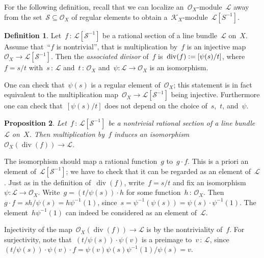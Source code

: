 \documentclass[10pt,reqno,a4paper]{amsbook}
\makeatletter
\theoremstyle{definition}
\newtheorem{defn}{Definition}[section]
\theoremstyle{plain}
\newtheorem{prop}[defn]{Proposition}
\theoremstyle{remark}
\newtheorem{rem}[defn]{Remark}
\renewcommand{\O}{\mathcal{O}}
\newcommand{\K}{\mathcal{K}}
\renewcommand{\L}{\mathcal{L}}
\renewcommand{\S}{\mathcal{S}}
\newcommand{\?}{\,{:}\,}
\renewcommand{\_}{\mathpunct{.}\,}
\newcommand{\XXX}[1]{\textbf{XXX: #1}}
\newcommand{\defeq}{\vcentcolon=}
\renewenvironment{proof}[1][\proofname]{\par
  \pushQED{\qed}%
  \normalfont \topsep6\p@\@plus6\p@\relax
  \trivlist
  \item[\hskip\labelsep
        \itshape
    #1\@addpunct{.}]\ignorespaces
}{%
  \popQED\endtrivlist\@endpefalse
}
\makeatother
\begin{document}

For the following definition, recall that we can localize an~$\O_X$-module~$\L$
away from the set~$\S \subseteq \O_X$ of regular elements to obtain
a~$\K_X$-module~$\L[S^{-1}]$.

\begin{defn}Let~$f\?\L[\S^{-1}]$ be a rational section of a line bundle~$\L$
on~$X$. Assume that~``$f$ is nontrivial'', that is multiplication by~$f$ is an
injective map~$\O_X \to \L[\S^{-1}]$. Then the \emph{associated divisor} of~$f$
is~$\operatorname{div}(f) \defeq [\psi(s)/t]$, where~$f = s/t$ with~$s\?\L$ and~$t\?\O_X$
and~$\psi : \L \to \O_X$ is an isomorphism.\end{defn}

One can check that~$\psi(s)$ is a regular element of~$\O_X$; this statement is
in fact equivalent to the multiplication map~$\O_X \to \L[\S^{-1}]$ being
injective. Furthermore one can check that~$[\psi(s)/t]$ does not depend on the
choice of~$s$,~$t$, and~$\psi$.

\begin{prop}Let~$f\?\L[\S^{-1}]$ be a nontrivial rational section of a line
bundle~$\L$ on~$X$. Then multiplication by~$f$ induces an
isomorphism~$\O_X(\operatorname{div}(f)) \to \L$.\end{prop}
\begin{proof}The isomorphism should map a rational function~$g$ to~$g \cdot f$. This
is a priori an element of~$\L[\S^{-1}]$; we have to check that it can be
regarded as an element of~$\L$. Just as in the definition
of~$\operatorname{div}(f)$, write~$f = s/t$ and fix an isomorphism~$\psi : \L
\to \O_X$. Write~$g = (t/\psi(s)) \cdot h$ for some function~$h\?\O_X$. Then~$g
\cdot f = sh/\psi(s) = h\psi^{-1}(1)$, since~$s = \psi^{-1}(\psi(s)) = \psi(s)
\cdot \psi^{-1}(1)$. The element~$h\psi^{-1}(1)$ can indeed be considered as an
element of~$\L$.

Injectivity of the map~$\O_X(\operatorname{div}(f)) \to \L$ is by the
nontriviality of~$f$. For surjectivity, note that~$(t/\psi(s)) \cdot \psi(v)$ is a
preimage to~$v\?\L$, since~$(t/\psi(s)) \cdot \psi(v) \cdot f = \psi(v) \psi(s)
\psi^{-1}(1) / \psi(s) = v$.
\end{proof}
\end{document}
